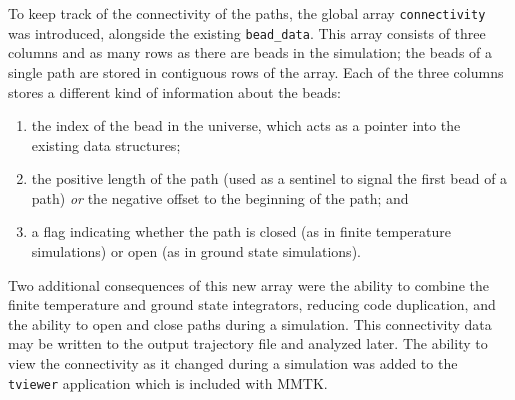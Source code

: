 To keep track of the connectivity of the paths, the global array \texttt{connectivity} was introduced, alongside the existing \texttt{bead\_data}.
This array consists of three columns and as many rows as there are beads in the simulation; the beads of a single path are stored in contiguous rows of the array.
Each of the three columns stores a different kind of information about the beads:
\begin{enumerate}[start=0]
	\item the index of the bead in the universe, which acts as a pointer into the existing data structures;
	\item the positive length of the path (used as a sentinel to signal the first bead of a path) \emph{or} the negative offset to the beginning of the path; and
	\item a flag indicating whether the path is closed (as in finite temperature simulations) or open (as in ground state simulations).
\end{enumerate}
Two additional consequences of this new array were the ability to combine the finite temperature and ground state integrators, reducing code duplication, and the ability to open and close paths during a simulation.
This connectivity data may be written to the output trajectory file and analyzed later.
The ability to view the connectivity as it changed during a simulation was added to the \texttt{tviewer} application which is included with MMTK.

